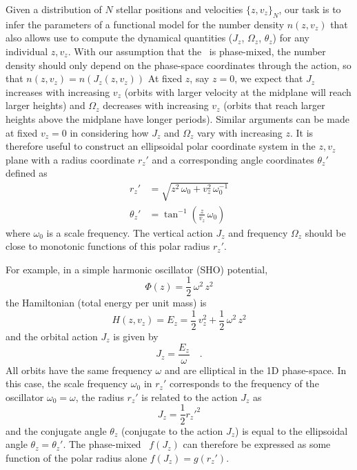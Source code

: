 Given a distribution of $N$ stellar positions and velocities $\{z, v_z\}_N$, our task is
to infer the parameters of a functional model for the number density $n(z, v_z)$ that
also allows use to compute the dynamical quantities ($J_z$, $\Omega_z$, $\theta_z$) for
any individual $z, v_z$.
With our assumption that the \df\ is phase-mixed, the number density should only depend
on the phase-space coordinates through the action, so that $n(z, v_z) = n(J_z(z, v_z))$
At fixed $z$, say $z=0$, we expect that $J_z$ increases with increasing $v_z$ (orbits
with larger velocity at the midplane will reach larger heights) and $\Omega_z$
decreases with increasing $v_z$ (orbits that reach larger heights above the midplane
have longer periods).
Similar arguments can be made at fixed $v_z=0$ in considering how $J_z$ and $\Omega_z$
vary with increasing $z$.
It is therefore useful to construct an ellipsoidal polar coordinate system in the $z,
v_z$ plane with a radius coordinate $r_z'$ and a corresponding angle coordinates
$\theta_z'$ defined as
\begin{align}
    r_z' &= \sqrt{z^2 \, \omega_0 + v_z^2 \, \omega_0^{-1}} \label{eq:rzp} \\
    \theta_z' &= \tan^{-1}\left(\frac{z}{v_z}\,\omega_0\right) \label{eq:thetazp}
\end{align}
where $\omega_0$ is a scale frequency.
The vertical action $J_z$ and frequency $\Omega_z$ should be close to monotonic
functions of this polar radius $r_z'$.

For example, in a simple harmonic oscillator (SHO) potential,
\begin{equation}
    \Phi(z) = \frac{1}{2} \, \omega^2 \, z^2
\end{equation}
the Hamiltonian (total energy per unit mass) is
\begin{equation}
    H(z, v_z) = E_z = \frac{1}{2} \, v_z^2 + \frac{1}{2} \, \omega^2 \,z^2
\end{equation}
and the orbital action $J_z$ is given by
\begin{equation}
    J_z = \frac{E_z}{\omega} \quad .
\end{equation}
All orbits have the same frequency $\omega$ and are elliptical in the 1D phase-space.
In this case, the scale frequency $\omega_0$ in $r_z'$ corresponds to the frequency of
the oscillator $\omega_0=\omega$, the radius $r_z'$ is related to the action $J_z$ as
\begin{equation}
    J_z = \frac{1}{2} r_z'^2
\end{equation}
and the conjugate angle $\theta_z$ (conjugate to the action $J_z$) is equal to the
ellipsoidal angle $\theta_z = \theta_z'$.
The phase-mixed \df\ $f(J_z)$ can therefore be expressed as some
function of the polar radius alone $f(J_z)=g(r_z')$.

